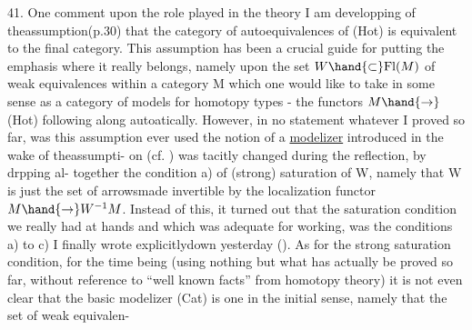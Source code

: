 41. One comment upon the role played in the theory I am developping of
theassumption(p.30) that the category of autoequivalences of (Hot) is
equivalent to the final category. This assumption has been a crucial
guide for putting the emphasis where it really belongs, namely upon
the set  $W\hand{\subset}\mathrm{Fl}(M)$ of weak equivalences within a category M which one
would like to take in some sense as a category of models for homotopy
types - the functors $M\hand{\to}$(Hot) following along autoatically. However,
in no statement whatever I proved so far, was this assumption ever used
 the notion of a \uline{modelizer} introduced in the wake of theassumpti-%
on (cf. ) was tacitly changed during the reflection, by drpping al-%
together the condition a) of (strong) saturation of W, namely that W is
just the set of arrows\unsure{\hand{,}}made invertible by the localization functor $M\hand{\to}W^{-1}M$.
Instead of this, it turned out that the saturation condition we really had
at hands and which  was adequate for working, was the conditions
a) to c) I finally wrote \hand{(}explicitly\hand{)}down yesterday (). As for the
strong saturation condition, for the time being (using nothing but what
has actually be proved so far, without reference to ``well known facts''
from homotopy theory)\hand{,} it is not even clear that the basic modelizer
(Cat) is one in the initial sense, namely that the set of weak equivalen-
